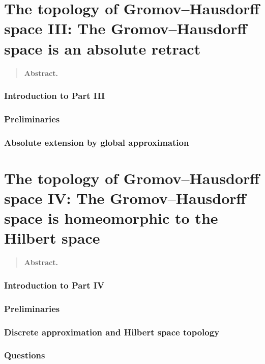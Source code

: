 \documentclass[11pt,reqno]{amsart}
\begin{document}
\clearpage
\part{The topology of Gromov--Hausdorff space III: The Gromov--Hausdorff space is an absolute retract}\label{part:topology}
\begin{quote}
\small
\noindent\textbf{Abstract.}

\end{quote}

\section{Introduction to Part III}\label{sec:intro-topology}


\section{Preliminaries}\label{sec:prelim-topology}




\section{Absolute extension by global approximation}\label{sec:ar}






\clearpage
\part{The topology of Gromov--Hausdorff space IV: The Gromov--Hausdorff space is homeomorphic to the  Hilbert space}\label{part:hilbert}
\begin{quote}
\small
\noindent\textbf{Abstract.}

\end{quote}

\section{Introduction to Part IV}\label{sec:intro-hilbert}


\section{Preliminaries}\label{sec:prelim-hilbert}





\section{Discrete approximation and Hilbert space topology}\label{sec:approximation}




\section{Questions}\label{sec:questions}


\printbibliography
\end{document}
